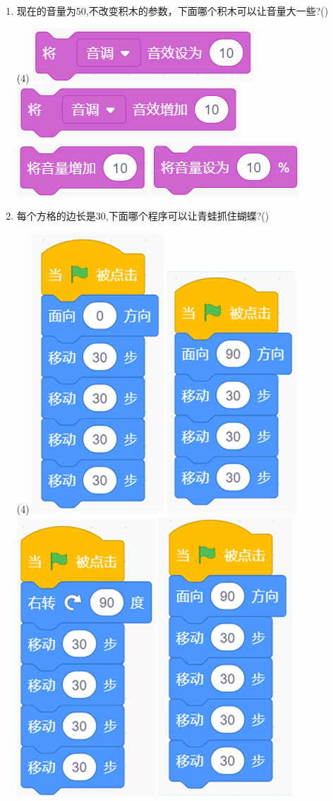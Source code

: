 \documentclass[10pt, a4paper]{article}
\begin{document}
\begin{enumerate}
        \item 现在的音量为50,不改变积木的参数，下面哪个积木可以让音量大一些?(\qquad)
        \begin{tasks}(4)
            \task \includegraphics[width=.15\textwidth]{11a.png}
            \task \includegraphics[width=.15\textwidth]{11b.png}
            \task \includegraphics[width=.1\textwidth]{11c.png}
            \task \includegraphics[width=.12\textwidth]{11d.png}
        \end{tasks}
        
        \item 每个方格的边长是30,下面哪个程序可以让青蛙抓住蝴蝶?(\qquad)
        \begin{tasks}(4)
            \task \includegraphics[width=.1\textwidth]{12a.png}
            \task \includegraphics[width=.11\textwidth]{12b.png}
            \task \includegraphics[width=.1\textwidth]{12c.png}
            \task \includegraphics[width=.1\textwidth]{12d.png}
        \end{tasks}


\end{enumerate}
\end{document}

